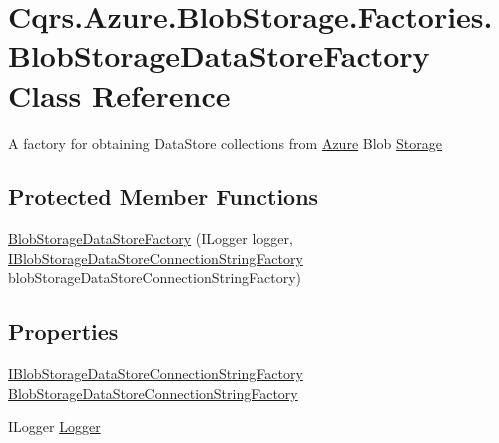 \hypertarget{classCqrs_1_1Azure_1_1BlobStorage_1_1Factories_1_1BlobStorageDataStoreFactory}{}\section{Cqrs.\+Azure.\+Blob\+Storage.\+Factories.\+Blob\+Storage\+Data\+Store\+Factory Class Reference}
\label{classCqrs_1_1Azure_1_1BlobStorage_1_1Factories_1_1BlobStorageDataStoreFactory}


A factory for obtaining Data\+Store collections from \hyperlink{namespaceCqrs_1_1Azure}{Azure} Blob \hyperlink{namespaceCqrs_1_1Azure_1_1Storage}{Storage}  


\subsection*{Protected Member Functions}
\begin{DoxyCompactItemize}
\item 
\hyperlink{classCqrs_1_1Azure_1_1BlobStorage_1_1Factories_1_1BlobStorageDataStoreFactory_a448e77623db63d7a66fc6b6c75466eac_a448e77623db63d7a66fc6b6c75466eac}{Blob\+Storage\+Data\+Store\+Factory} (I\+Logger logger, \hyperlink{interfaceCqrs_1_1Azure_1_1BlobStorage_1_1DataStores_1_1IBlobStorageDataStoreConnectionStringFactory}{I\+Blob\+Storage\+Data\+Store\+Connection\+String\+Factory} blob\+Storage\+Data\+Store\+Connection\+String\+Factory)
\end{DoxyCompactItemize}
\subsection*{Properties}
\begin{DoxyCompactItemize}
\item 
\hyperlink{interfaceCqrs_1_1Azure_1_1BlobStorage_1_1DataStores_1_1IBlobStorageDataStoreConnectionStringFactory}{I\+Blob\+Storage\+Data\+Store\+Connection\+String\+Factory} \hyperlink{classCqrs_1_1Azure_1_1BlobStorage_1_1Factories_1_1BlobStorageDataStoreFactory_a5df6d152d265ee439183ef60b3deb666_a5df6d152d265ee439183ef60b3deb666}{Blob\+Storage\+Data\+Store\+Connection\+String\+Factory}
\item 
I\+Logger \hyperlink{classCqrs_1_1Azure_1_1BlobStorage_1_1Factories_1_1BlobStorageDataStoreFactory_a18a5d0c661d5fd43c075a7c926aedf0f_a18a5d0c661d5fd43c075a7c926aedf0f}{Logger}
\end{DoxyCompactItemize}



